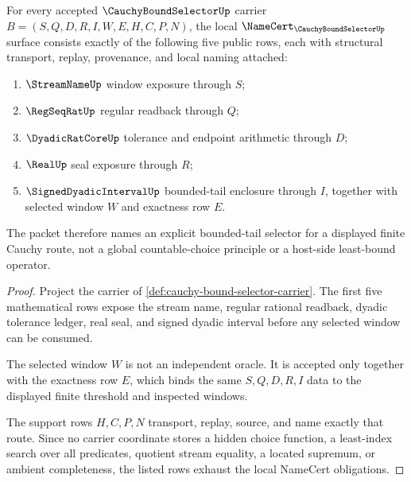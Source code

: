 \begin{theorem}
\label{thm:cauchy-bound-selector-namecert-obligations}
For every accepted $\CauchyBoundSelectorUp$ carrier $B=(S,Q,D,R,I,W,E,H,C,P,N)$, the local $\NameCert_{\CauchyBoundSelectorUp}$ surface consists exactly of the following five public rows, each with structural transport, replay, provenance, and local naming attached:
\begin{enumerate}
\item $\StreamNameUp$ window exposure through $S$;
\item $\RegSeqRatUp$ regular readback through $Q$;
\item $\DyadicRatCoreUp$ tolerance and endpoint arithmetic through $D$;
\item $\RealUp$ seal exposure through $R$;
\item $\SignedDyadicIntervalUp$ bounded-tail enclosure through $I$, together with selected window $W$ and exactness row $E$.
\end{enumerate}
The packet therefore names an explicit bounded-tail selector for a displayed finite Cauchy route, not a global countable-choice principle or a host-side least-bound operator.
\end{theorem}
\begin{proof}
Project the carrier of \autoref{def:cauchy-bound-selector-carrier}. The first five mathematical rows expose the stream name, regular rational readback, dyadic tolerance ledger, real seal, and signed dyadic interval before any selected window can be consumed.

The selected window $W$ is not an independent oracle. It is accepted only together with the exactness row $E$, which binds the same $S,Q,D,R,I$ data to the displayed finite threshold and inspected windows.

The support rows $H,C,P,N$ transport, replay, source, and name exactly that route. Since no carrier coordinate stores a hidden choice function, a least-index search over all predicates, quotient stream equality, a located supremum, or ambient completeness, the listed rows exhaust the local NameCert obligations.
\end{proof}

